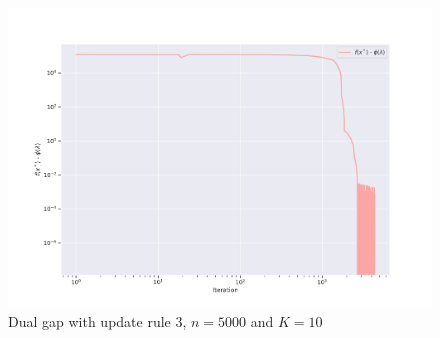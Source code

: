 \documentclass[notitlepage]{article}
\begin{document}
\vfill
\hspace{0pt}

\newpage

\hspace{0pt}
\vfill

\begin{minipage}{.7\textwidth}
  \begin{figure}[H]
    \centering
    \includegraphics[scale=0.5]{pics/n=5000_K=10_gap_rule=3.png}
    \caption{Dual gap with update rule $3$, $n=5000$ and $K=10$}
    \label{fig:rule-3-n-5000-k-10-gap}
  \end{figure}
\end{minipage}
\begin{minipage}{.3\textwidth}
  \begin{table}[H]
    \centering
    \caption{\centering Sum up table}
    \label{tab:n-5000-K-10-rule-3}
  \end{table}
\end{minipage}
\end{document}
